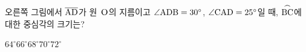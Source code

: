 \noindent\begin{minipage}[t]{0.58\linewidth}\vspace{0pt}\raggedright 오른쪽 그림에서 $\overline{\mathrm{AD}}$가 원~$\mathrm{O}$의 지름이고 $\angle\mathrm{ADB}=30^\circ$, $\angle\mathrm{CAD}=25^\circ$일 때, $\overset{\frown}{\mathrm{BC}}$에 대한 중심각의 크기는?\end{minipage}\hfill\begin{minipage}[t]{0.4\linewidth}\vspace{0pt}\centering \resizebox{\ifdim\width>\linewidth\linewidth\else\width\fi}{!}{}\end{minipage}\par
\begin{choicesii}{$64^\circ$}{$66^\circ$}{$68^\circ$}{$70^\circ$}{$72^\circ$}\end{choicesii}

